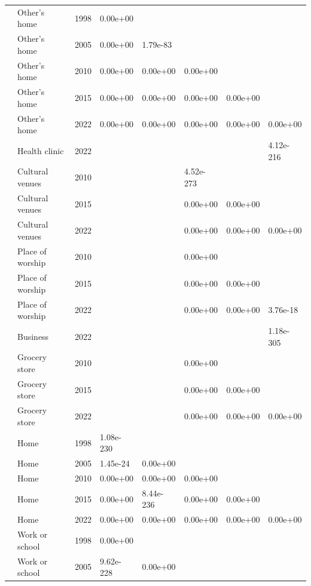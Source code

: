 \documentclass[preprint, 3p,
authoryear]{elsarticle} %
\begin{document}
\begin{longtable}[t]{llllllll}
\nopagebreak
 & Other's home & 1998 & 0.00e+00 &  &  &  & \\
\nopagebreak
 & Other's home & 2005 & 0.00e+00 & 1.79e-83 &  &  & \\
\nopagebreak
 & Other's home & 2010 & 0.00e+00 & 0.00e+00 & 0.00e+00 &  & \\
\nopagebreak
 & Other's home & 2015 & 0.00e+00 & 0.00e+00 & 0.00e+00 & 0.00e+00 & \\
\nopagebreak
 & Other's home & 2022 & 0.00e+00 & 0.00e+00 & 0.00e+00 & 0.00e+00 & 0.00e+00\\
\nopagebreak
 & Health clinic & 2022 &  &  &  &  & 4.12e-216\\
\nopagebreak
 & Cultural venues & 2010 &  &  & 4.52e-273 &  & \\
\nopagebreak
 & Cultural venues & 2015 &  &  & 0.00e+00 & 0.00e+00 & \\
\nopagebreak
 & Cultural venues & 2022 &  &  & 0.00e+00 & 0.00e+00 & 0.00e+00\\
\nopagebreak
 & Place of worship & 2010 &  &  & 0.00e+00 &  & \\
\nopagebreak
 & Place of worship & 2015 &  &  & 0.00e+00 & 0.00e+00 & \\
\nopagebreak
 & Place of worship & 2022 &  &  & 0.00e+00 & 0.00e+00 & 3.76e-18\\
\nopagebreak
\multirow[t]{-34}{*}{\raggedright\arraybackslash Walking} & Business & 2022 &  &  &  &  & 1.18e-305\\
\cmidrule{1-8}\pagebreak[0]
 & Grocery store & 2010 &  &  & 0.00e+00 &  & \\
\nopagebreak
 & Grocery store & 2015 &  &  & 0.00e+00 & 0.00e+00 & \\
\nopagebreak
 & Grocery store & 2022 &  &  & 0.00e+00 & 0.00e+00 & 0.00e+00\\
\nopagebreak
 & Home & 1998 & 1.08e-230 &  &  &  & \\
\nopagebreak
 & Home & 2005 & 1.45e-24 & 0.00e+00 &  &  & \\
\nopagebreak
 & Home & 2010 & 0.00e+00 & 0.00e+00 & 0.00e+00 &  & \\
\nopagebreak
 & Home & 2015 & 0.00e+00 & 8.44e-236 & 0.00e+00 & 0.00e+00 & \\
\nopagebreak
 & Home & 2022 & 0.00e+00 & 0.00e+00 & 0.00e+00 & 0.00e+00 & 0.00e+00\\
\nopagebreak
 & Work or school & 1998 & 0.00e+00 &  &  &  & \\
\nopagebreak
 & Work or school & 2005 & 9.62e-228 & 0.00e+00 &  &  & \\

\end{longtable}
\end{document}
